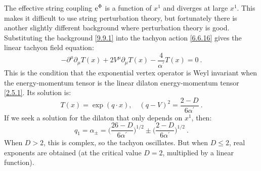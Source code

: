 The effective string coupling $\mathrm{e}^{\Phi}$ is a function of $x^{1}$ and diverges at large $x^{1}$. This makes it difficult to use string perturbation theory, but fortunately there is another slightly different background where perturbation theory is good.
Substituting the background \eqref{9.9.1} into the tachyon action \eqref{6.6.16} gives the linear tachyon field equation:
\begin{equation}
	-\partial^{\mu} \partial_{\mu} T(x)+2 V^{\mu} \partial_{\mu} T(x)-\frac{4}{\alpha^{\prime}} T(x)=0 \:. \label{9.9.2}
\end{equation}
This is the condition that the exponential vertex operator is Weyl invariant when the energy-momentum tensor is the linear dilaton energy-momentum tensor \eqref{2.5.1}. Its solution is:
\begin{equation}
	T(x)=\exp (q \cdot x), \quad (q-V)^{2}=\frac{2-D}{6 \alpha^{\prime}} \:.
	\label{9.9.3}
\end{equation}
If we seek a solution for the dilaton that only depends on $x^{1}$, then:
\begin{equation}
	q_{1}=\alpha_{\pm}=\biggl(\frac{26-D}{6 \alpha^{\prime}}\biggr)^{1/2} \pm \biggl(\frac{2-D}{6 \alpha^{\prime}}\biggr)^{1/2} \:. 
	\label{9.9.4}
\end{equation}
When $D>2$, this is complex, so the tachyon oscillates. But when $D \leq 2$, real exponents are obtained (at the critical value $D=2$, multiplied by a linear function).
